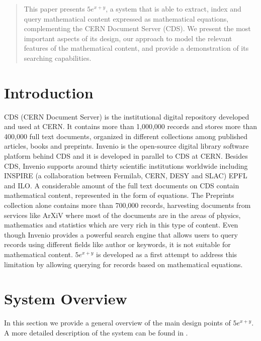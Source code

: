 \documentclass{sig-alternate}
\begin{document}
\maketitle
\begin{abstract}
This paper presents $5e^{x+y}$, a system that is able to extract, index and query mathematical content expressed as mathematical equations, complementing the CERN Document Server (CDS)\cite{CDS1}. We present the most important aspects of its design, our approach to model the relevant features of the mathematical content, and provide a demonstration of its searching capabilities.

\end{abstract}

\section{Introduction}
CDS (CERN Document Server) is the institutional digital repository developed and used at CERN\cite{CERN}. It contains more than 1,000,000 records and stores more than 400,000 full text documents, organized in different collections among published articles, books and preprints. Invenio\cite{invenio} is the open-source digital library software platform behind CDS and it is developed in parallel to CDS at CERN. Besides CDS, Invenio supports around thirty scientific institutions worldwide including INSPIRE (a collaboration between Fermilab, CERN, DESY and SLAC) EPFL and ILO. 
A considerable amount of the full text documents on CDS contain mathematical content, represented in the form of equations. The Preprints collection alone contains more than 700,000 records, harvesting documents from services like ArXiV\cite{arxiv} where most of the documents are in the areas of physics, mathematics and statistics which are very rich in this type of content. Even though Invenio provides a powerful search engine that allows users to query records using different fields like author or keywords, it is not suitable for mathematical content. $5e^{x+y}$ is developed as a first attempt to address this limitation by allowing querying for records based on mathematical equations.

\section{System Overview}
In this section we provide a general overview of the main design points of $5e^{x+y}$. A more detailed description of the system can be found in \cite{mathexplorerweb}.
\end{document}
